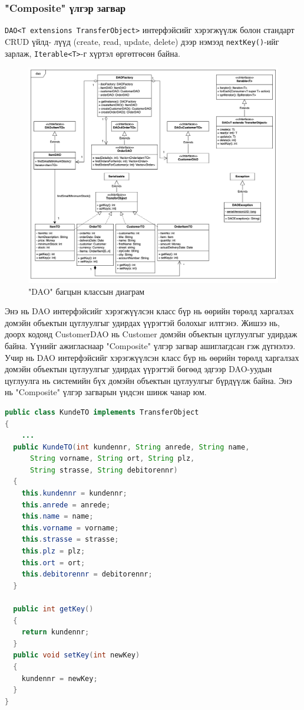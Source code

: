 \subsubsection{"Composite" үлгэр загвар}
\verb|DAO<T extensions TransferObject>| интерфэйсийг хэрэгжүүлж болон стандарт CRUD үйлд- лүүд (create, read, update, delete) дээр нэмээд \verb|nextKey()|-ийг зарлаж, \verb|Iterable<T>|-г хүртэл өргөтгөсөн байна.
\begin{figure}
	\centering
	\includegraphics[width=15cm]{images/diagram3.png}
	\caption{"DAO" багцын классын диаграм}
	\label{fig:diagram3}
\end{figure}
Энэ нь DAO интерфэйсийг хэрэгжүүлсэн класс бүр нь өөрийн төрөлд харгалзах домэйн объектын цуглуулгыг удирдах үүрэгтэй болохыг илтгэнэ. Жишээ нь, доорх кодонд CustomerDAO нь Customer домэйн объектын цуглуулгыг удирдаж байна. Үүнийг ажигласнаар "Composite" үлгэр загвар ашиглагдсан гэж дүгнэлээ. Учир нь DAO интерфэйсийг хэрэгжүүлсэн класс бүр нь өөрийн төрөлд харгалзах домэйн объектын цуглуулгыг удирдах үүрэгтэй бөгөөд эдгээр DAO-уудын цуглуулга нь системийн бүх домэйн объектын цуглуулгыг бүрдүүлж байна. Энэ нь "Composite" үлгэр загварын үндсэн шинж чанар юм.\\

\begin{lstlisting}[language=Java, caption=KundeTO класс, frame=single]
public class KundeTO implements TransferObject
{
	...
  public KundeTO(int kundennr, String anrede, String name,
      String vorname, String ort, String plz,
      String strasse, String debitorennr)
  {
    this.kundennr = kundennr;
    this.anrede = anrede;
    this.name = name;
    this.vorname = vorname;
    this.strasse = strasse;
    this.plz = plz;
    this.ort = ort;
    this.debitorennr = debitorennr;
  }

  public int getKey()
  {
    return kundennr;
  }
  public void setKey(int newKey)
  {
    kundennr = newKey;
  }
}
\end{lstlisting}


